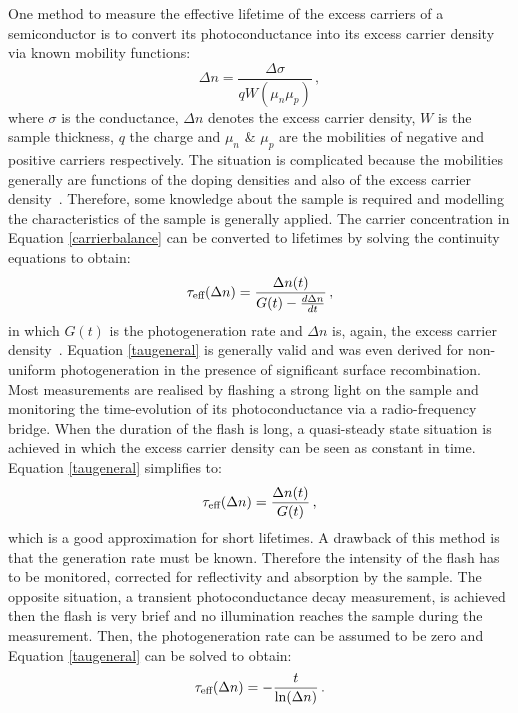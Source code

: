 One method to measure the effective lifetime of the excess carriers of a semiconductor is to convert its photoconductance into its excess carrier density via known mobility functions:
\begin{equation}
\label{carrierbalance}
	\Delta n = \frac{\Delta \sigma}{qW (\mu_n \mu_p)} \, ,
\end{equation}
where $\sigma$ is the conductance, $\Delta n$ denotes the excess carrier density, $W$ is the sample thickness, $q$ the charge and $\mu_n$ \& $\mu_p$ are the mobilities of negative and positive carriers respectively. The situation is complicated because the mobilities generally are functions of the doping densities and also of the excess carrier density~\cite{sintononline}. Therefore, some knowledge about the sample is required and modelling the characteristics of the sample is generally applied. The carrier concentration in Equation \eqref{carrierbalance} can be converted to lifetimes by solving the continuity equations to obtain:
\begin{equation}
\label{taugeneral}
	\tau_{\text{eff}} (\Delta n) = \frac{\Delta n (t)}{G(t) - \frac{d\Delta n}{dt} } \, ,
\end{equation}
in which $G(t)$ is the photogeneration rate and $\Delta n$ is, again, the excess carrier density~\cite{nagel_lifetime}. Equation \eqref{taugeneral} is generally valid and was even derived for non-uniform photogeneration in the presence of significant surface recombination. Most measurements are realised by flashing a strong light on the sample and monitoring the time-evolution of its photoconductance via a radio-frequency bridge. When the duration of the flash is long, a quasi-steady state situation is achieved in which the excess carrier density can be seen as constant in time. Equation \eqref{taugeneral} simplifies to:
\begin{equation}
\label{qsspd}
	\tau_{\text{eff}} (\Delta n) = \frac{\Delta n (t)}{G(t)} \, ,
\end{equation}
which is a good approximation for short lifetimes. A drawback of this method is that the generation rate must be known. Therefore the intensity of the flash has to be monitored, corrected for reflectivity and absorption by the sample. The opposite situation, a transient photoconductance decay measurement, is achieved then the flash is very brief and no illumination reaches the sample during the measurement. Then, the photogeneration rate can be assumed to be zero and Equation \eqref{taugeneral} can be solved to obtain:
\begin{equation}
\label{tpd}
	\tau_{\text{eff}} (\Delta n) = - \frac{t}{\ln (\Delta n)} \, .
\end{equation}

